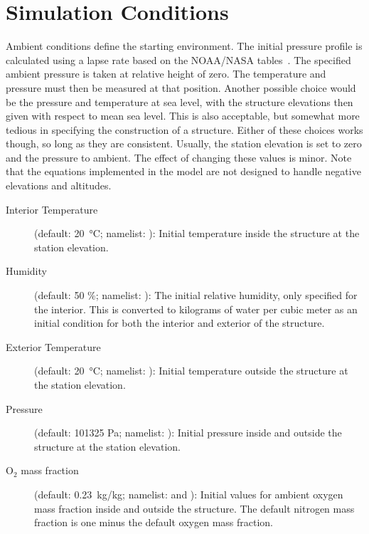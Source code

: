\section{Simulation Conditions}
\label{info:INIT}

Ambient conditions define the starting environment. The initial pressure profile is calculated using a lapse rate based on the NOAA/NASA tables~\cite{GPO:Atmosphere}. The specified ambient pressure is taken at relative height of zero. The temperature and pressure must then be measured at that position.  Another possible choice would be the pressure and temperature at sea level, with the structure elevations then given with respect to mean sea level.  This is also acceptable, but somewhat more tedious in specifying the construction of a structure.  Either of these choices works though, so long as they are consistent. Usually, the station elevation is set to zero and the pressure to ambient. The effect of changing these values is minor. Note that the equations implemented in the model are not designed to handle negative elevations and altitudes.
\begin{description}
\item[Interior Temperature] (default: 20~\unit{\degreeCelsius}; namelist: ): Initial temperature inside the structure at the station elevation.

\item[Humidity] (default: 50 \%; namelist: ): The initial relative humidity, only specified for the interior.  This is converted to kilograms of water per cubic meter as an initial condition for both the interior and exterior of the structure.

\item[Exterior Temperature] (default: 20~\unit{\degreeCelsius}; namelist: ): Initial temperature outside the structure at the station elevation.

\item[Pressure] (default: 101325 Pa; namelist: ): Initial pressure inside and outside the structure at the station elevation.

\item[O$_2$ mass fraction] (default: 0.23~\unit{kg/kg}; namelist:  and ):
Initial values for ambient oxygen mass fraction inside and outside the structure. The default nitrogen mass fraction is one minus the default oxygen mass fraction.
\end{description}



